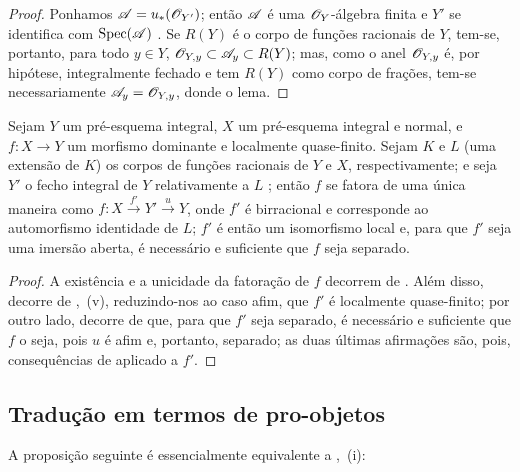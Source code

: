 \begin{proof}
Ponhamos $\mathscr{A}=u_*(\mathscr{O}_{Y'})$; então $\mathscr{A}$ é uma $\mathscr{O}_Y$-álgebra finita e $Y'$ se identifica com $\operatorname{Spec}(\mathscr{A})$ .
Se $R(Y)$ é o corpo de funções racionais de $Y$, tem-se, portanto, para todo $y\in Y$, $\mathscr{O}_{Y,y}\subset\mathscr{A}_y\subset R(Y)$; mas, como o anel $\mathscr{O}_{Y,y}$ é, por hipótese, integralmente fechado e tem $R(Y)$ como corpo de frações, tem-se necessariamente $\mathscr{A}_y=\mathscr{O}_{Y,y}$, donde o lema.
\end{proof}

\begin{corollary}[8.12.11]
\label{IV.8.12.11}
Sejam $Y$ um pré-esquema integral, $X$ um pré-esquema integral e normal, e $f:X\to Y$ um morfismo dominante e localmente quase-finito.
Sejam $K$ e $L$ (uma extensão de $K$) os corpos de funções racionais de $Y$ e $X$, respectivamente; e seja $Y'$ o fecho integral de $Y$ relativamente a $L$ ; então $f$ se fatora de uma única maneira como $f:X\xrightarrow{f'}Y'\xrightarrow{u}Y$, onde $f'$ é birracional e corresponde ao automorfismo identidade de $L$; $f'$ é então um isomorfismo local e, para que $f'$ seja uma imersão aberta, é necessário e suficiente que $f$ seja separado.
\end{corollary}

\begin{proof}
A existência e a unicidade da fatoração de $f$ decorrem de .
Além disso, decorre de ,~(v), reduzindo-nos ao caso afim, que $f'$ é localmente quase-finito; por outro lado, decorre de  que, para que $f'$ seja separado, é necessário e suficiente que $f$ o seja, pois $u$ é afim e, portanto, separado; as duas últimas afirmações são, pois, consequências de  aplicado a $f'$.
\end{proof}


\subsection{Tradução em termos de pro-objetos}
\label{subsection:IV.8.13}

A proposição seguinte é essencialmente equivalente a ,~(i):


